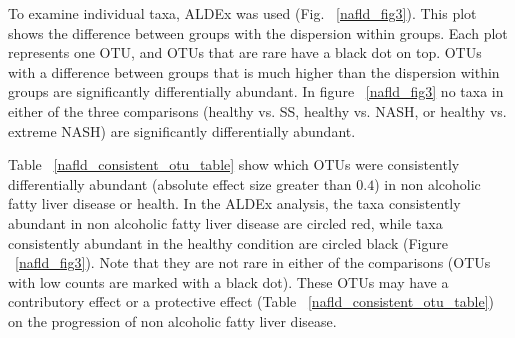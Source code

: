 To examine individual taxa, ALDEx was used (Fig. ~\ref{nafld_fig3}). This plot shows the difference between groups with the dispersion within groups. Each plot represents one OTU, and OTUs that are rare have a black dot on top. OTUs with a difference between groups that is much higher than the dispersion within groups are significantly differentially abundant. In figure ~\ref{nafld_fig3} no taxa in either of the three comparisons (healthy vs. SS, healthy vs. NASH, or healthy vs. extreme NASH) are significantly differentially abundant.

Table ~\ref{nafld_consistent_otu_table} show which OTUs were consistently differentially abundant (absolute effect size greater than $0.4$) in non alcoholic fatty liver disease or health. In the ALDEx analysis, the taxa consistently abundant in non alcoholic fatty liver disease are circled red, while taxa consistently abundant in the healthy condition are circled black (Figure ~\ref{nafld_fig3}). Note that they are not rare in either of the comparisons (OTUs with low counts are marked with a black dot). These OTUs may have a contributory effect or a protective effect (Table ~\ref{nafld_consistent_otu_table}) on the progression of non alcoholic fatty liver disease.

